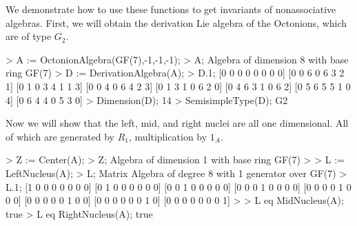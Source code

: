 \begin{example}
We demonstrate how to use these functions to get invariants of nonassociative algebras.
First, we will obtain the derivation Lie algebra of the Octonions, which are of type $G_2$.

\begin{code}
> A := OctonionAlgebra(GF(7),-1,-1,-1);
> A;
Algebra of dimension 8 with base ring GF(7)
> D := DerivationAlgebra(A);
> D.1;
[0 0 0 0 0 0 0 0]
[0 0 6 0 6 3 2 1]
[0 1 0 3 4 1 1 3]
[0 0 4 0 6 4 2 3]
[0 1 3 1 0 6 2 0]
[0 4 6 3 1 0 6 2]
[0 5 6 5 5 1 0 4]
[0 6 4 4 0 5 3 0]
> Dimension(D);
14
> SemisimpleType(D);
G2
\end{code}

Now we will show that the left, mid, and right nuclei are all one dimensional. 
All of which are generated by $R_1$, multiplication by $1_A$.

\begin{code}
> Z := Center(A);
> Z;
Algebra of dimension 1 with base ring GF(7)
> 
> L := LeftNucleus(A);
> L;
Matrix Algebra of degree 8 with 1 generator over GF(7)
> L.1;
[1 0 0 0 0 0 0 0]
[0 1 0 0 0 0 0 0]
[0 0 1 0 0 0 0 0]
[0 0 0 1 0 0 0 0]
[0 0 0 0 1 0 0 0]
[0 0 0 0 0 1 0 0]
[0 0 0 0 0 0 1 0]
[0 0 0 0 0 0 0 1]
> 
> L eq MidNucleus(A);
true
> L eq RightNucleus(A);
true
\end{code}
\end{example}


